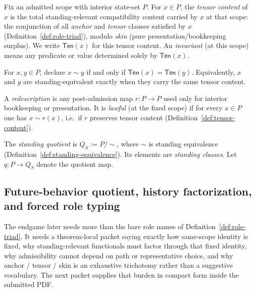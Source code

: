 \begin{definition}\label{def:tensor-content}
Fix an admitted scope with interior state-set $P$.
For $x\in P$, the \emph{tensor content} of $x$ is the total standing-relevant compatibility content
carried by $x$ at that scope: the conjunction of all \emph{anchor} and \emph{tensor} clauses satisfied
by $x$ (Definition~\ref{def:role-triad}), modulo \emph{skin} (pure presentation/bookkeeping surplus).
We write $\mathsf{Ten}(x)$ for this tensor content.
An \emph{invariant} (at this scope) means any predicate or value determined solely by $\mathsf{Ten}(x)$.
\end{definition}

\begin{definition}\label{def:standing-equivalence}
For $x,y\in P$, declare $x\sim y$ if and only if $\mathsf{Ten}(x)=\mathsf{Ten}(y)$.
Equivalently, $x$ and $y$ are standing-equivalent exactly when they carry the same tensor content.
\end{definition}

\begin{definition}\label{def:lawful-redescription}
A \emph{redescription} is any post-admission map $r:P\to P$ used only for interior bookkeeping or
presentation.
It is \emph{lawful} (at the fixed scope) if for every $x\in P$ one has $x\sim r(x)$, i.e.\ if $r$
preserves tensor content (Definition~\ref{def:tensor-content}).
\end{definition}

\begin{definition}\label{def:standing-quotient}
The \emph{standing quotient} is $Q_S:=P/{\sim}$, where $\sim$ is standing equivalence
(Definition~\ref{def:standing-equivalence}).
Its elements are \emph{standing classes}. Let $q:P\to Q_S$ denote the quotient map.
\end{definition}


\subsection{Future-behavior quotient, history factorization, and forced role typing}\label{subsec:future-behavior-ats-packet}
The endgame later needs more than the bare role names of Definition~\ref{def:role-triad}. It needs a theorem-local packet saying exactly how same-scope identity is fixed, why standing-relevant functionals must factor through that fixed identity, why admissibility cannot depend on path or representative choice, and why anchor / tensor / skin is an exhaustive trichotomy rather than a suggestive vocabulary. The next packet supplies that burden in compact form inside the submitted PDF.

